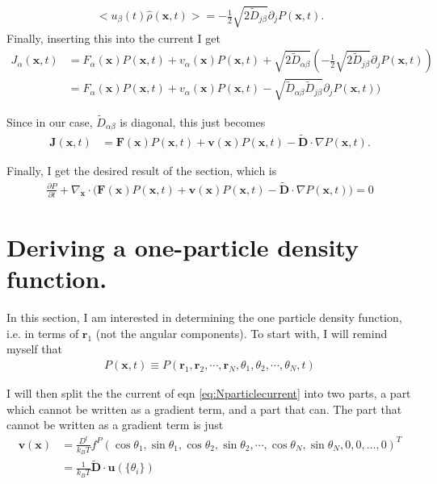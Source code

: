 \documentclass{article}
\begin{document}
\begin{align}
  <u_{\beta}(t)\hat{\rho}(\bm{x},t)>=-\frac{1}{2}\sqrt{2\tilde{D}_{j\beta}}
  \partial_jP(\bm{x},t).
\end{align}
Finally, inserting this into the current I get
\begin{align}
  J_{\alpha}(\bm{x},t)&=F_{\alpha}(\bm{x})P(\bm{x},t)+v_{\alpha}(\bm{x})P(\bm{x},t)
                        +\sqrt{2\tilde{D}_{\alpha\beta}}(-\frac{1}{2}\sqrt{2\tilde{D}_{j\beta}}
                        \partial_jP(\bm{x},t))\nonumber\\
                      &=F_{\alpha}(\bm{x})P(\bm{x},t)+v_{\alpha}(\bm{x})P(\bm{x},t)
                        -\sqrt{\tilde{D}_{\alpha\beta}\tilde{D}_{j\beta}}
                        \partial_jP(\bm{x},t))
\end{align}

Since in our case, $\tilde{D}_{\alpha\beta}$ is diagonal, this just becomes
\begin{align}\label{eq:Nparticlecurrent}
  \bm{J}(\bm{x},t)&=\bm{F}(\bm{x})P(\bm{x},t)+\bm{v}(\bm{x})P(\bm{x},t)
                    -\bm{\tilde{D}}\cdot\nabla P(\bm{x},t).
\end{align}

Finally, I get the desired result of the section, which is
\begin{align}\label{eq:NparticleFP}
  \frac{\partial P}{\partial t} + \nabla_{\bm{x}}\cdot\big(\bm{F}(\bm{x})P(\bm{x},t)
  +\bm{v}(\bm{x})P(\bm{x},t)-\bm{\tilde{D}}\cdot\nabla P(\bm{x},t)\big)=0
\end{align}


\section{Deriving a one-particle density function.}

In this section, I am interested in determining the one particle density function, i.e. in
terms of $\bm{r}_1$ (not the angular components). To start with, I will remind myself that
\begin{align}
  P(\bm{x},t)\equiv P(\bm{r}_1,\bm{r}_2,\cdots,\bm{r}_N,\theta_1,\theta_2,\cdots,\theta_N,t)
\end{align}

I will then split the the current of eqn \ref{eq:Nparticlecurrent} into two parts, a part which
cannot be written as a gradient term, and a part that can. The part that cannot be written as
a gradient term is just
\begin{align}
  \bm{v}(\bm{x})&=\frac{D^t}{k_BT}f^P(\cos\theta_1,\sin\theta_1,\cos\theta_2,
                  \sin\theta_2,\cdots,\cos\theta_N,\sin\theta_N,0,0,\dots,0)^T\nonumber\\
                &=\frac{1}{k_BT}\bm{\tilde{D}}\cdot \bm{u}(\{\theta_i\})
\end{align}
\end{document}
